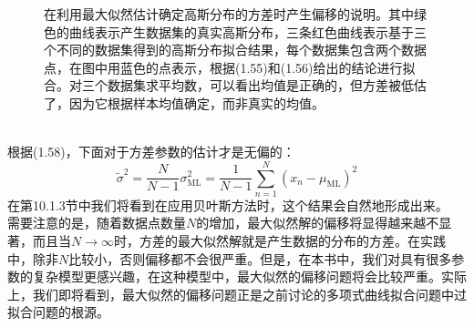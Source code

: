 \documentclass[b5paper]{book}
\numberwithin{equation}{chapter}
\begin{document}
{\begin{figure}[ht]
		\caption{在利用最大似然估计确定高斯分布的方差时产生偏移的说明。其中绿色的曲线表示产生数据集的真实高斯分布，三条红色曲线表示基于三个不同的数据集得到的高斯分布拟合结果，每个数据集包含两个数据点，在图中用蓝色的点表示，根据(1.55)和(1.56)给出的结论进行拟合。对三个数据集求平均数，可以看出均值是正确的，但方差被低估了，因为它根据样本均值确定，而非真实的均值。}
		\label{fig:1-15}
	\end{figure}
	\\
	\indent 根据(1.58)，下面对于方差参数的估计才是无偏的：
	\begin{equation}
		\widetilde{\sigma}^2 = \frac{N}{N-1}\sigma_{\mathrm{ML}}^2 = \frac{1}{N-1}\sum_{n=1}^{N}(x_n-\mu_{\mathrm{ML}})^2
	\end{equation}
	\indent 在第10.1.3节中我们将看到在应用贝叶斯方法时，这个结果会自然地形成出来。\\
	\indent 需要注意的是，随着数据点数量$N$的增加，最大似然解的偏移将显得越来越不显著，而且当$N \rightarrow \infty$时，方差的最大似然解就是产生数据的分布的方差。在实践中，除非$N$比较小，否则偏移都不会很严重。但是，在本书中，我们对具有很多参数的复杂模型更感兴趣，在这种模型中，最大似然的偏移问题将会比较严重。实际上，我们即将看到，最大似然的偏移问题正是之前讨论的多项式曲线拟合问题中过拟合问题的根源。
	}
\end{document}
